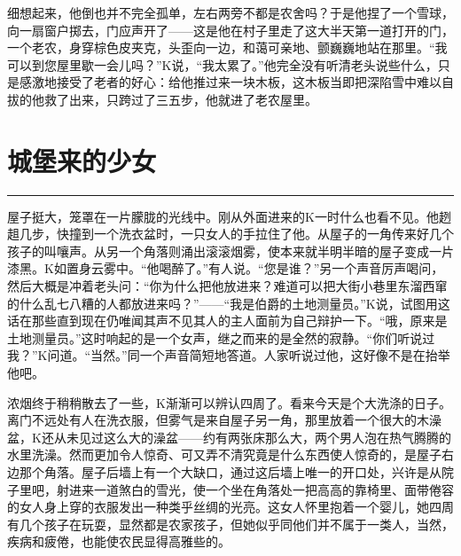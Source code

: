 \documentclass[12pt,a4paper]{article}
\begin{document}
细想起来，他倒也并不完全孤单，左右两旁不都是农舍吗？于是他捏了一个雪球，向一扇窗户掷去，门应声开了——这是他在村子里走了这大半天第一道打开的门，一个老农，身穿棕色皮夹克，头歪向一边，和蔼可亲地、颤巍巍地站在那里。“我可以到您屋里歇一会儿吗？”K说，“我太累了。”他完全没有听清老头说些什么，只是感激地接受了老者的好心：给他推过来一块木板，这木板当即把深陷雪中难以自拔的他救了出来，只跨过了三五步，他就进了老农屋里。
\par{}
\newpage
\section{城堡来的少女}
\vspace{0.5em}
\vspace{0.3em}

\noindent\rule{\textwidth}{0.4pt}

\vspace{0.3em}



屋子挺大，笼罩在一片朦胧的光线中。刚从外面进来的K一时什么也看不见。他趔趄几步，快撞到一个洗衣盆时，一只女人的手拉住了他。从屋子的一角传来好几个孩子的叫嚷声。从另一个角落则涌出滚滚烟雾，使本来就半明半暗的屋子变成一片漆黑。K如置身云雾中。“他喝醉了。”有人说。“您是谁？”另一个声音厉声喝问，然后大概是冲着老头问：“你为什么把他放进来？难道可以把大街小巷里东溜西窜的什么乱七八糟的人都放进来吗？”——“我是伯爵的土地测量员。”K说，试图用这话在那些直到现在仍唯闻其声不见其人的主人面前为自己辩护一下。“哦，原来是土地测量员。”这时响起的是一个女声，继之而来的是全然的寂静。“你们听说过我？”K问道。“当然。”同一个声音简短地答道。人家听说过他，这好像不是在抬举他吧。

浓烟终于稍稍散去了一些，K渐渐可以辨认四周了。看来今天是个大洗涤的日子。离门不远处有人在洗衣服，但雾气是来自屋子另一角，那里放着一个很大的木澡盆，K还从未见过这么大的澡盆——约有两张床那么大，两个男人泡在热气腾腾的水里洗澡。然而更加令人惊奇、可又弄不清究竟是什么东西使人惊奇的，是屋子右边那个角落。屋子后墙上有一个大缺口，通过这后墙上唯一的开口处，兴许是从院子里吧，射进来一道煞白的雪光，使一个坐在角落处一把高高的靠椅里、面带倦容的女人身上穿的衣服发出一种类乎丝绸的光亮。这女人怀里抱着一个婴儿，她四周有几个孩子在玩耍，显然都是农家孩子，但她似乎同他们并不属于一类人，当然，疾病和疲倦，也能使农民显得高雅些的。
\end{document}
